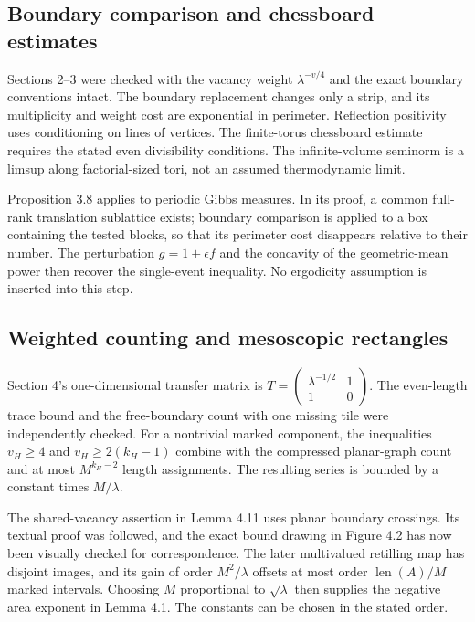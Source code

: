 \documentclass[10pt]{article}
\begin{document}
\subsection*{Boundary comparison and chessboard estimates}
Sections 2–3 were checked with the vacancy weight \(\lambda^{-v/4}\) and the exact boundary conventions intact. The boundary replacement changes only a strip, and its multiplicity and weight cost are exponential in perimeter. Reflection positivity uses conditioning on lines of vertices. The finite-torus chessboard estimate requires the stated even divisibility conditions. The infinite-volume seminorm is a limsup along factorial-sized tori, not an assumed thermodynamic limit.\par
Proposition 3.8 applies to periodic Gibbs measures. In its proof, a common full-rank translation sublattice exists; boundary comparison is applied to a box containing the tested blocks, so that its perimeter cost disappears relative to their number. The perturbation \(g=1+\epsilon f\) and the concavity of the geometric-mean power then recover the single-event inequality. No ergodicity assumption is inserted into this step.\par
\subsection*{Weighted counting and mesoscopic rectangles}
Section 4’s one-dimensional transfer matrix is \(T=\left(\begin{smallmatrix}\lambda^{-1/2}&1\\1&0\end{smallmatrix}\right)\). The even-length trace bound and the free-boundary count with one missing tile were independently checked. For a nontrivial marked component, the inequalities \(v_H\geq4\) and \(v_H\geq2(k_H-1)\) combine with the compressed planar-graph count and at most \(M^{k_H-2}\) length assignments. The resulting series is bounded by a constant times \(M/\lambda\).\par
The shared-vacancy assertion in Lemma 4.11 uses planar boundary crossings. Its textual proof was followed, and the exact bound drawing in Figure 4.2 has now been visually checked for correspondence. The later multivalued retilling map has disjoint images, and its gain of order \(M^2/\lambda\) offsets at most order \(\operatorname{len}(A)/M\) marked intervals. Choosing \(M\) proportional to \(\sqrt\lambda\) then supplies the negative area exponent in Lemma 4.1. The constants can be chosen in the stated order.\par
\end{document}
